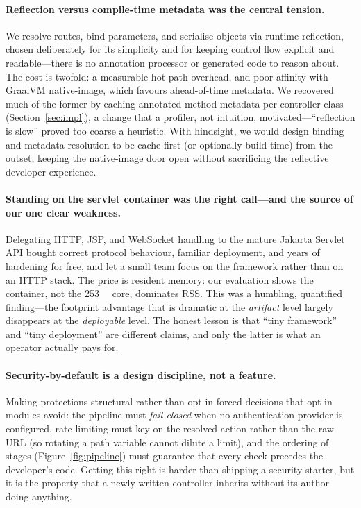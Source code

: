 \paragraph{Reflection versus compile-time metadata was the central
tension.} We resolve routes, bind parameters, and serialise objects via
runtime reflection, chosen deliberately for its simplicity and for
keeping control flow explicit and readable---there is no annotation
processor or generated code to reason about. The cost is twofold: a
measurable hot-path overhead, and poor affinity with GraalVM
native-image, which favours ahead-of-time metadata. We recovered much
of the former by caching annotated-method metadata per controller class
(Section~\ref{sec:impl}), a change that a profiler, not intuition,
motivated---``reflection is slow'' proved too coarse a heuristic. With
hindsight, we would design binding and metadata resolution to be
cache-first (or optionally build-time) from the outset, keeping the
native-image door open without sacrificing the reflective developer
experience.

\paragraph{Standing on the servlet container was the right call---and
the source of our one clear weakness.} Delegating HTTP, JSP, and
WebSocket handling to the mature Jakarta Servlet API bought correct
protocol behaviour, familiar deployment, and years of hardening for
free, and let a small team focus on the framework rather than on an
HTTP stack. The price is resident memory: our evaluation shows the
container, not the \SI{253}{\kilo\byte} core, dominates RSS. This was a
humbling, quantified finding---the footprint advantage that is dramatic
at the \emph{artifact} level largely disappears at the \emph{deployable}
level. The honest lesson is that ``tiny framework'' and ``tiny
deployment'' are different claims, and only the latter is what an
operator actually pays for.

\paragraph{Security-by-default is a design discipline, not a feature.}
Making protections structural rather than opt-in forced decisions that
opt-in modules avoid: the pipeline must \emph{fail closed} when no
authentication provider is configured, rate limiting must key on the
resolved action rather than the raw URL (so rotating a path variable
cannot dilute a limit), and the ordering of stages (Figure~\ref{fig:pipeline})
must guarantee that every check precedes the developer's code. Getting
this right is harder than shipping a security starter, but it is the
property that a newly written controller inherits without its author
doing anything.

